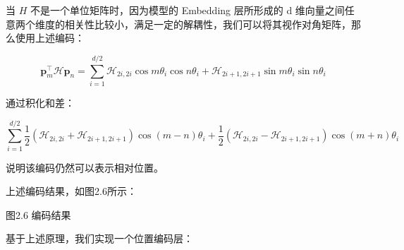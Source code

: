 \documentclass[
]{article}
\begin{document}
当 \(H\) 不是一个单位矩阵时，因为模型的 Embedding 层所形成的 d
维向量之间任意两个维度的相关性比较小，满足一定的解耦性，我们可以将其视作对角矩阵，那么使用上述编码：

\[
\begin{equation}\boldsymbol{p}_m^{\top} \boldsymbol{\mathcal{H}} \boldsymbol{p}_n=\sum_{i=1}^{d/2} \boldsymbol{\mathcal{H}}_{2i,2i} \cos m\theta_i \cos n\theta_i + \boldsymbol{\mathcal{H}}_{2i+1,2i+1} \sin m\theta_i \sin n\theta_i\end{equation}
\]

通过积化和差：

\[
\begin{equation}\sum_{i=1}^{d/2} \frac{1}{2}\left(\boldsymbol{\mathcal{H}}_{2i,2i} + \boldsymbol{\mathcal{H}}_{2i+1,2i+1}\right) \cos (m-n)\theta_i + \frac{1}{2}\left(\boldsymbol{\mathcal{H}}_{2i,2i} - \boldsymbol{\mathcal{H}}_{2i+1,2i+1}\right) \cos (m+n)\theta_i \end{equation}
\]

说明该编码仍然可以表示相对位置。

上述\hspace{0pt}编码结果，如图2.6所示：

图2.6 编码结果

基于上述原理，我们实现一个\hspace{0pt}位置编码层：
\end{document}
